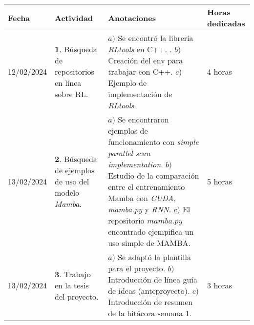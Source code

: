 \documentclass[12pt]{article}
\begin{document}
\begin{minipage}[h]{\textwidth}
	\centering
	\begin{tabularx}{\textwidth}{|p{2cm}|X|X|p{2cm}|} 
		\hline
		\rowcolor{encabezado}
		\textbf{Fecha} & 
		\textbf{Actividad} & 
		\textbf{Anotaciones} & 
		\textbf{Horas dedicadas} \\ \hline
		12/02/2024 & 
		$\mathbf{1}.$ Búsqueda de repositorios en línea sobre RL. & 
		$a)$ Se encontró la librería \textit{RLtools} en C++. . \newline $b)$ Creación del env para trabajar con C++. \newline $c)$ Ejemplo de implementación de \textit{RLtools}. \newline  & 
		4 horas \\
	 	13/02/2024 & 
	 	$\mathbf{2}.$ Búsqueda de ejemplos de uso del modelo \textit{Mamba}. &
	 	$a)$ Se encontraron ejemplos de funcionamiento con \textit{simple parallel scan implementation}. \newline $b)$ Estudio de la comparación entre el entrenamiento Mamba con \textit{CUDA}, \textit{mamba.py} y \textit{RNN}. \newline $c)$ El repositorio $mamba.py$ encontrado ejempifica un uso simple de MAMBA. \newline & 
	 	5 horas \\
	 	13/02/2024 & 
	 	$\mathbf{3}.$ Trabajo en la tesis del proyecto. & 
	 	$a)$ Se adaptó la plantilla para el proyecto. \newline $b)$ Introducción de línea guía de ideas (anteproyecto). \newline $c)$ Introducción de resumen de la bitácora semana 1. \newline & 
	 	3 horas \\
	 	
	 	\hline
	\end{tabularx}
\end{minipage}	 	
	 	
\end{document}
